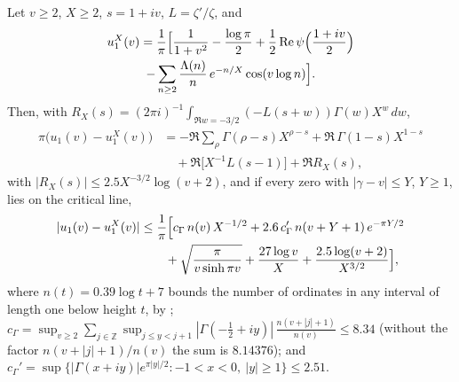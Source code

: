 \begin{theorem}\label{cx:thm:fastu1}
Let $v\ge2$, $X\ge2$, $s=1+iv$, $L=\zeta'/\zeta$, and
\begin{multline*}
u_1^X(v)=\frac1\pi\Bigl[\frac1{1+v^2}-\frac{\log\pi}2+\frac12\Re\psi\Bigl(\frac{1+iv}2\Bigr)\\-\sum_{n\ge2}\frac{\Lambda(n)}n\,e^{-n/X}\cos(v\log n)\Bigr].
\end{multline*}
Then, with $R_X(s)=(2\pi i)^{-1}\int_{\Re w=-3/2}(-L(s+w))\Gamma(w)X^w\,dw$,
\[
\begin{split}\pi\bigl(u_1(v)-u_1^X(v)\bigr)&=-\Re\sum_\rho\Gamma(\rho-s)X^{\rho-s}+\Re\,\Gamma(1-s)X^{1-s}\\&\quad+\Re\bigl[X^{-1}L(s-1)\bigr]+\Re R_X(s),\end{split}
\]
with $|R_X(s)|\le2.5X^{-3/2}\log(v+2)$, and if every zero with $|\gamma-v|\le Y$, $Y\ge1$, lies on the critical line,
\[
\begin{split}|u_1(v)-u_1^X(v)|&\le\frac1\pi\Bigl[c_\Gamma\,n(v)\,X^{-1/2}+2.6\,c_\Gamma'\,n(v+Y+1)\,e^{-\pi Y/2}\\&\qquad+\sqrt{\frac{\pi}{v\sinh\pi v}}+\frac{27\log v}X+\frac{2.5\log(v+2)}{X^{3/2}}\Bigr],\end{split}
\]
where $n(t)=0.39\log t+7$ bounds the number of ordinates in any interval of length one below height $t$, by \cite[(1.7), (2.7) and Corollary~1.4]{HSW22}; $c_\Gamma=\sup_{v\ge2}\sum_{j\in\mathbb Z}\sup_{j\le y<j+1}|\Gamma(-\tfrac12+iy)|\,\frac{n(v+|j|+1)}{n(v)}\le8.34$ (without the factor $n(v+|j|+1)/n(v)$ the sum is $8.14376$); and $c_\Gamma'=\sup\{|\Gamma(x+iy)|e^{\pi|y|/2}:-1<x<0,\ |y|\ge1\}\le2.51$.
\end{theorem}

